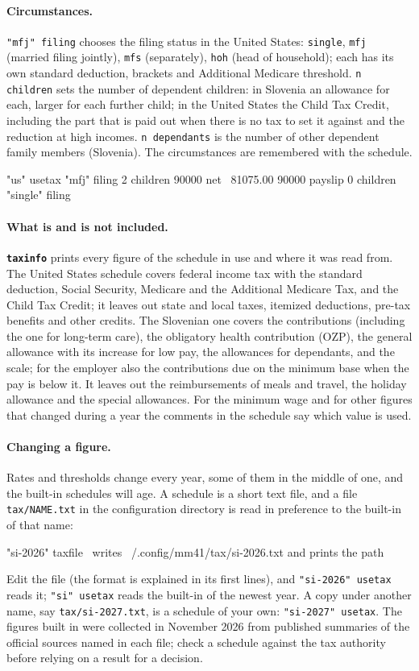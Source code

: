 \documentclass[11pt,letterpaper]{article}
\newcommand{\code}[1]{\texttt{#1}}
\newcommand{\cmd}[1]{\texttt{\textbf{#1}}}
\begin{document}
\paragraph{Circumstances.} \code{"mfj" filing} chooses the filing status in the United States: \code{single}, \code{mfj} (married filing jointly), \code{mfs} (separately), \code{hoh} (head of household); each has its own standard deduction, brackets and Additional Medicare threshold. \code{n children} sets the number of dependent children: in Slovenia an allowance for each, larger for each further child; in the United States the Child Tax Credit, including the part that is paid out when there is no tax to set it against and the reduction at high incomes. \code{n dependants} is the number of other dependent family members (Slovenia). The circumstances are remembered with the schedule.
\begin{rpn}
"us" usetax "mfj" filing 2 children
90000 net            \ 81075.00
90000 payslip
0 children "single" filing
\end{rpn}

\paragraph{What is and is not included.} \cmd{taxinfo} prints every figure of the schedule in use and where it was read from. The United States schedule covers federal income tax with the standard deduction, Social Security, Medicare and the Additional Medicare Tax, and the Child Tax Credit; it leaves out state and local taxes, itemized deductions, pre-tax benefits and other credits. The Slovenian one covers the contributions (including the one for long-term care), the obligatory health contribution (OZP), the general allowance with its increase for low pay, the allowances for dependants, and the scale; for the employer also the contributions due on the minimum base when the pay is below it. It leaves out the reimbursements of meals and travel, the holiday allowance and the special allowances. For the minimum wage and for other figures that changed during a year the comments in the schedule say which value is used.

\paragraph{Changing a figure.} Rates and thresholds change every year, some of them in the middle of one, and the built-in schedules will age. A schedule is a short text file, and a file \code{tax/NAME.txt} in the configuration directory is read in preference to the built-in of that name:
\begin{rpn}
"si-2026" taxfile    \ writes ~/.config/mm41/tax/si-2026.txt and prints the path
\end{rpn}
Edit the file (the format is explained in its first lines), and \code{"si-2026" usetax} reads it; \code{"si" usetax} reads the built-in of the newest year. A copy under another name, say \code{tax/si-2027.txt}, is a schedule of your own: \code{"si-2027" usetax}. The figures built in were collected in November 2026 from published summaries of the official sources named in each file; check a schedule against the tax authority before relying on a result for a decision.
\end{document}
